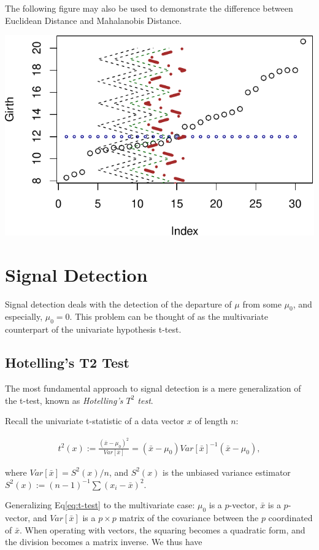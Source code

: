 \documentclass[]{book}
\theoremstyle{definition}
\theoremstyle{definition}
\theoremstyle{definition}
\theoremstyle{remark}
\let\BeginKnitrBlock\begin \let\EndKnitrBlock\end
\begin{document}
\BeginKnitrBlock{remark}
{}The following figure may also be used to
demonstrate the difference between Euclidean Distance and Mahalanobis
Distance.
\EndKnitrBlock{remark}

\includegraphics[width=0.5\linewidth]{Rcourse_files/figure-latex/unnamed-chunk-203-1}

\section{Signal Detection}\label{signal-detection}

Signal detection deals with the detection of the departure of \(\mu\)
from some \(\mu_0\), and especially, \(\mu_0=0\). This problem can be
thought of as the multivariate counterpart of the univariate hypothesis
t-test.

\subsection{Hotelling's T2 Test}\label{hotellings-t2-test}

The most fundamental approach to signal detection is a mere
generalization of the t-test, known as \emph{Hotelling's \(T^2\) test}.

Recall the univariate t-statistic of a data vector \(x\) of length
\(n\):

\begin{align}
  t^2(x):= \frac{(\bar{x}-\mu_0)^2}{Var[\bar{x}]}= (\bar{x}-\mu_0)Var[\bar{x}]^{-1}(\bar{x}-\mu_0),
  \label{eq:t-test}
\end{align}

where \(Var[\bar{x}]=S^2(x)/n\), and \(S^2(x)\) is the unbiased variance
estimator \(S^2(x):=(n-1)^{-1}\sum (x_i-\bar x)^2\).

Generalizing Eq\eqref{eq:t-test} to the multivariate case: \(\mu_0\) is a
\(p\)-vector, \(\bar x\) is a \(p\)-vector, and \(Var[\bar x]\) is a
\(p \times p\) matrix of the covariance between the \(p\) coordinated of
\(\bar x\). When operating with vectors, the squaring becomes a
quadratic form, and the division becomes a matrix inverse. We thus have
\end{document}
